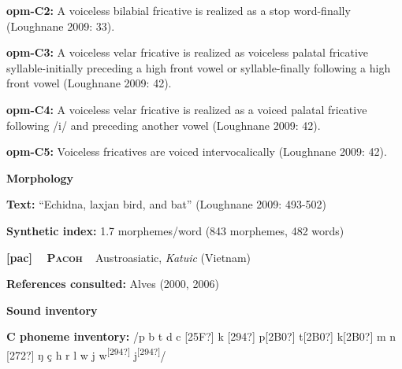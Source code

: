 \begin{styleBody}
\textbf{opm-C2: }A voiceless bilabial fricative is realized as a stop word-finally (Loughnane 2009: 33).
\end{styleBody}

\begin{styleBody}
\textbf{opm-C3: }A voiceless velar fricative is realized as voiceless palatal fricative syllable-initially preceding a high front vowel or syllable-finally following a high front vowel (Loughnane 2009: 42).
\end{styleBody}

\begin{styleBody}
\textbf{opm-C4: }A voiceless velar fricative is realized as a voiced palatal fricative following /i/ and preceding another vowel (Loughnane 2009: 42).
\end{styleBody}

\begin{styleBody}
\textbf{opm-C5: }Voiceless fricatives are voiced intervocalically (Loughnane 2009: 42).
\end{styleBody}

\begin{styleBody}
\textbf{Morphology}
\end{styleBody}

\begin{styleBody}
\textbf{Text:} “Echidna, laxjan bird, and bat” (Loughnane 2009: 493-502)
\end{styleBody}

\begin{styleBody}
\textbf{Synthetic index: }1.7 morphemes/word (843 morphemes, 482 words)
\end{styleBody}

\clearpage\begin{styleBody}
\textbf{[pac] }\ \ \textbf{\textsc{Pacoh}}\textbf{\ \ }Austroasiatic, \textit{Katuic} (Vietnam)
\end{styleBody}

\begin{styleBody}
\textbf{References consulted: }Alves (2000, 2006)
\end{styleBody}

\begin{styleBody}
\textbf{Sound inventory}
\end{styleBody}

\begin{styleBody}
\textbf{C phoneme inventory:} /p b t d c [25F?] k [294?] p[2B0?] t[2B0?] k[2B0?] m n [272?] ŋ ç h r l w j w\textsuperscript{[294?]} j\textsuperscript{[294?]}/
\end{styleBody}

